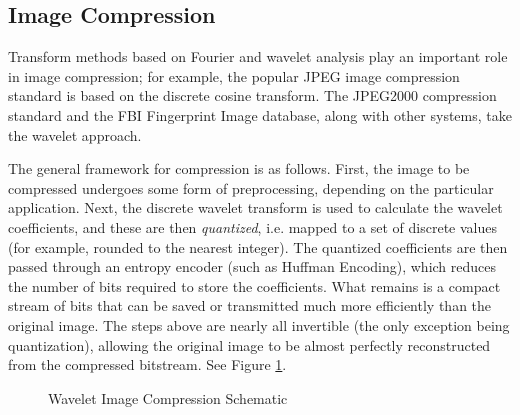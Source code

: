 \subsection*{Image Compression} %

Transform methods based on Fourier and wavelet analysis play an important role in image compression; for example, the popular JPEG image compression standard is based on the discrete cosine transform.
The JPEG2000 compression standard and the FBI Fingerprint Image database, along with other systems, take the wavelet approach.

The general framework for compression is as follows.
First, the image to be compressed undergoes some form of preprocessing, depending on the particular application.
Next, the discrete wavelet transform is used to calculate the wavelet coefficients, and these are then \emph{quantized}, i.e. mapped to a set of discrete values (for example, rounded to the nearest integer).
The quantized coefficients are then passed through an entropy encoder (such as Huffman Encoding), which reduces the number of bits required to store the coefficients.
What remains is a compact stream of bits that can be saved or transmitted much more efficiently than the original image.
The steps above are nearly all invertible (the only exception being quantization), allowing the original image to be almost perfectly reconstructed from the compressed bitstream.
See Figure \ref{tikz:wsqscheme}.

\begin{figure}[H]
\centering
{}
\caption{Wavelet Image Compression Schematic}
\label{tikz:wsqscheme}
\end{figure}

